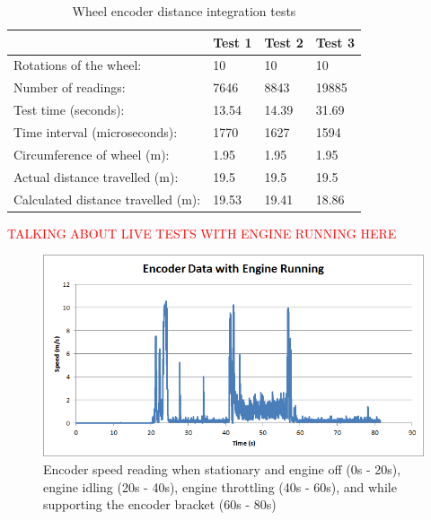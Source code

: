 \documentclass[main.tex]{subfiles}
\begin{document}
\begin{table}[ht]
\centering
\caption{Wheel encoder distance integration tests}
\begin{tabular}{l|l|l|l}
                                   & Test 1 & Test 2 & Test 3 \\ \hline
Rotations of the wheel:            & 10     & 10     & 10     \\
Number of readings:                & 7646   & 8843   & 19885  \\
Test time (seconds):               & 13.54  & 14.39  & 31.69  \\
Time interval (microseconds):      & 1770   & 1627   & 1594   \\
Circumference of wheel (m):        & 1.95   & 1.95   & 1.95   \\
Actual distance travelled (m):     & 19.5   & 19.5   & 19.5   \\
Calculated distance travelled (m): & 19.53  & 19.41  & 18.86  \\
\end{tabular}
\end{table}

\textcolor{red}{TALKING ABOUT LIVE TESTS WITH ENGINE RUNNING HERE}

\begin{figure}[ht]
\includegraphics[width=1\textwidth]{5-Testing/Encoder_data_with_engine_running.png}
\centering
\caption{Encoder speed reading when stationary and engine off (0s - 20s), engine idling (20s - 40s), engine throttling (40s - 60s), and while supporting the encoder bracket (60s - 80s)}
\end{figure}
\end{document}
